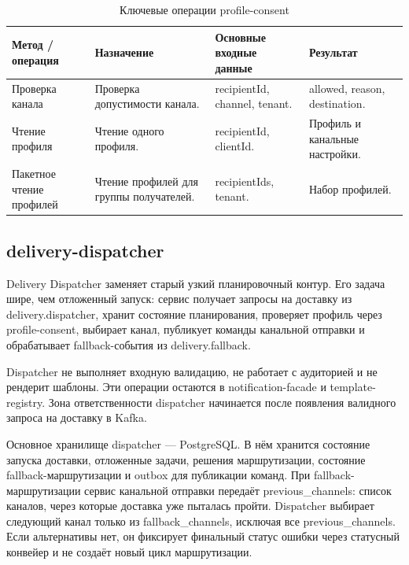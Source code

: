 \begin{table}[H]
    \centering
    \footnotesize
    \renewcommand{\arraystretch}{1.15}
    \caption{Ключевые операции profile-consent}
    \label{tab:impl-profile-api}
    \begin{tabular}{|L{0.24\textwidth}|L{0.28\textwidth}|L{0.24\textwidth}|L{0.16\textwidth}|}
        \hline
        \textbf{Метод / операция} & \textbf{Назначение} & \textbf{Основные входные данные} & \textbf{Результат} \\
        \hline
        Проверка канала & Проверка допустимости канала. & recipientId, channel, tenant. & allowed, reason, destination. \\
        \hline
        Чтение профиля & Чтение одного профиля. & recipientId, clientId. & Профиль и канальные настройки. \\
        \hline
        Пакетное чтение профилей & Чтение профилей для группы получателей. & recipientIds, tenant. & Набор профилей. \\
        \hline
    \end{tabular}
\end{table}

\subsection{delivery-dispatcher}

Delivery Dispatcher заменяет старый узкий планировочный контур. Его задача шире, чем отложенный запуск: сервис получает запросы на доставку из delivery.dispatcher, хранит состояние планирования, проверяет профиль через profile-consent, выбирает канал, публикует команды канальной отправки и обрабатывает fallback-события из delivery.fallback.

Dispatcher не выполняет входную валидацию, не работает с аудиторией и не рендерит шаблоны. Эти операции остаются в notification-facade и template-registry. Зона ответственности dispatcher начинается после появления валидного запроса на доставку в Kafka.

Основное хранилище dispatcher --- PostgreSQL. В нём хранится состояние запуска доставки, отложенные задачи, решения маршрутизации, состояние fallback-маршрутизации и outbox для публикации команд. При fallback-маршрутизации сервис канальной отправки передаёт previous\_channels: список каналов, через которые доставка уже пыталась пройти. Dispatcher выбирает следующий канал только из fallback\_channels, исключая все previous\_channels. Если альтернативы нет, он фиксирует финальный статус ошибки через статусный конвейер и не создаёт новый цикл маршрутизации.

